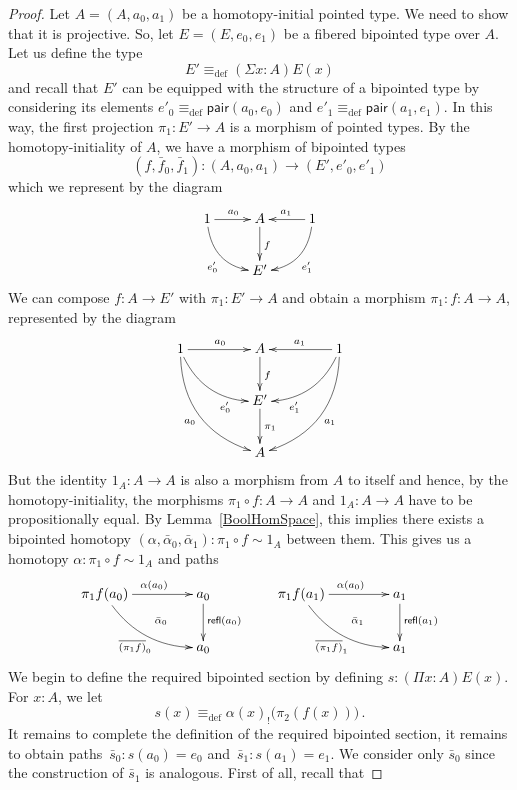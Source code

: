 \documentclass[10pt,a4paper,oneside,reqno]{amsart}
\numberwithin{equation}{section}
\theoremstyle{mythm}
\theoremstyle{mydef}
\theoremstyle{myrmk}
\newcommand{\deq}{\equiv}
\newcommand{\peq}{=}
\newcommand{\defeq}{\deq_{\mathrm{def}}}
\newcommand{\co}{\colon}
\newcommand{\pair}{\mathsf{pair}}
\newcommand{\refl}{\mathsf{refl}}
\begin{document}
\begin{proof}
Let $A = (A, a_0, a_1)$ be a homotopy-initial pointed type. We need to show that it is projective. So, let $E = (E, e_0, e_1)$ be a fibered 
bipointed type over $A$. Let us define the type 
\[
E' \defeq (\Sigma x \co A) E(x) 
\]
and recall that $E'$ can be equipped with the structure of a bipointed type by considering its elements $e'_0 \defeq \pair(a_0, e_0)$ and $e'_1 \defeq \pair(a_1, e_1)$. In this way,  the first projection $\pi_1 \co E' \to A$ is a morphism of pointed types. By the homotopy-initiality of $A$, we have a morphism of bipointed types
\[
(f, \bar{f}_0, \bar{f}_1) \co (A, a_0, a_1)  \to (E', e'_0, e'_1) 
\]
which we represent by the diagram
\[
\xymatrix{
1 \ar@/_1pc/[dr]_{e'_0} \ar[r]^{a_0} & A  \ar[d]^f & 1 \ar[l]_{a_1} \ar@/^1pc/[dl]^{e'_1} \\
 & E' & }
 \]
 We can compose $f \co A \to E'$ with $\pi_1 \co E' \to A$ and obtain a morphism $\pi_1 \co f \co A \to A$, represented by the diagram
  \[
\xymatrix@C=1.5cm{
1 \ar@/_1pc/[dr]_(.7){e'_0} \ar[r]^{a_0} \ar@/_1.5pc/[ddr]_{a_0}  & A  \ar[d]^f & 1 \ar[l]_{a_1} \ar@/^1pc/[dl]^(.7){e'_1} \ar@/^1.5pc/[ddl]^{a_1}  \\
 & E' \ar[d]^{\pi_1} & \\
 & A &  }
 \]
But the identity $1_A \co A \to A$ is also a morphism from $A$ to itself and hence, by the homotopy-initiality, the morphisms $\pi_1 \circ f \co A \to A$
and $1_A \co A \to A$ have to be propositionally equal. By Lemma~\ref{BoolHomSpace}, this implies there exists a bipointed homotopy $(\alpha,
\bar{\alpha}_0,\bar{\alpha}_1) \co \pi_1 \circ f \sim 1_A$ between them. This gives us a homotopy $\alpha \co \pi_1 \circ f \sim 1_A$ and paths
\[
\xymatrix@C=1.5cm{
\pi_1 f (a_0) \ar[r]^{\alpha(a_0)} \ar@/_1pc/[dr]_{\overline{(\pi_1 f)}_0} \ar@{}[dr]|{\quad \bar{\alpha}_0}  & a_0 \ar[d]^{\refl(a_0)} \\
 & a_0 } \qquad
 \xymatrix@C=1.5cm{
\pi_1 f (a_1) \ar[r]^{\alpha(a_0)} \ar@/_1pc/[dr]_{\overline{(\pi_1 f)}_1} \ar@{}[dr]|{\quad \bar{\alpha}_1}  & a_1 \ar[d]^{\refl(a_1)} \\
 & a_1 }
\]
We begin to define the required bipointed section by defining  $s \co (\Pi x \co A) E(x)$. For $x \co A$, we let
\begin{equation}
\label{equ:defreqsection}
s(x) \defeq \alpha(x)_{!} \big( \pi_2(f(x)) \big) \, . 
\end{equation}
It remains to complete the definition of the required bipointed section, it remains to obtain paths~$\bar{s}_0 \co s(a_0)  \peq e_0$ and~$\bar{s}_1 \co s(a_1) \peq e_1$. We consider only $\bar{s}_0$ since the construction of $\bar{s}_1$ is  analogous. First of all, recall that 

\end{proof}
\end{document}

